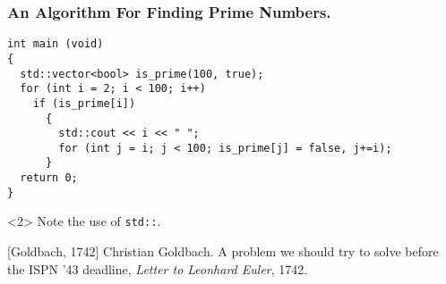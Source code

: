 \documentclass{beamer}
\begin{document}
\begin{frame}[fragile]
  \frametitle{An Algorithm For Finding Prime Numbers.}

\begin{verbatim}
int main (void)
{
  std::vector<bool> is_prime(100, true);
  for (int i = 2; i < 100; i++)
    if (is_prime[i])
      {
        std::cout << i << " ";
        for (int j = i; j < 100; is_prime[j] = false, j+=i);
      }
  return 0;
}
\end{verbatim}
  \begin{uncoverenv}<2> Note the use of \verb|std::|.
  \end{uncoverenv}
\end{frame}

\begin{thebibliography}{10}
  [Goldbach, 1742]
  Christian Goldbach.
  \newblock A problem we should try to solve before the ISPN '43
  deadline,
  \newblock \emph{Letter to Leonhard Euler}, 1742.
\end{thebibliography}
\end{document}
